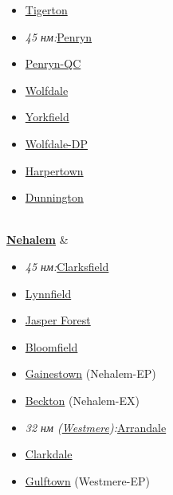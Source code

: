 \documentclass[a4paper,11pt]{article}
\begin{document}
\begin{tabular}
\begin{tabular}
\begin{tabular}
\begin{itemize}
	\item \href{https://ru.wikipedia.org/w/index.php?title=Tigerton&amp;action=edit&amp;redlink=1}{Tigerton}
	\item \textit{45 нм:}\href{https://ru.wikipedia.org/wiki/Penryn}{Penryn}
	\item \href{https://ru.wikipedia.org/w/index.php?title=Penryn-QC&amp;action=edit&amp;redlink=1}{Penryn-QC}
	\item \href{https://ru.wikipedia.org/w/index.php?title=Wolfdale&amp;action=edit&amp;redlink=1}{Wolfdale}
	\item \href{https://ru.wikipedia.org/wiki/Yorkfield}{Yorkfield}
	\item \href{https://ru.wikipedia.org/w/index.php?title=Wolfdale-DP&amp;action=edit&amp;redlink=1}{Wolfdale-DP}
	\item \href{https://ru.wikipedia.org/w/index.php?title=Harpertown&amp;action=edit&amp;redlink=1}{Harpertown}
	\item \href{https://ru.wikipedia.org/w/index.php?title=Dunnington&amp;action=edit&amp;redlink=1}{Dunnington}
\end{itemize} \\ 
\textbf{\href{https://ru.wikipedia.org/wiki/Nehalem}{Nehalem}} & 
\begin{itemize}
	\item \textit{45 нм:}\href{https://ru.wikipedia.org/w/index.php?title=Clarksfield&amp;action=edit&amp;redlink=1}{Clarksfield}
	\item \href{https://ru.wikipedia.org/w/index.php?title=Lynnfield&amp;action=edit&amp;redlink=1}{Lynnfield}
	\item \href{https://ru.wikipedia.org/w/index.php?title=Jasper_Forest&amp;action=edit&amp;redlink=1}{Jasper Forest}
	\item \href{https://ru.wikipedia.org/wiki/Bloomfield}{Bloomfield}
	\item \href{https://ru.wikipedia.org/w/index.php?title=Gainestown&amp;action=edit&amp;redlink=1}{Gainestown} (Nehalem-EP)
	\item \href{https://ru.wikipedia.org/w/index.php?title=Beckton&amp;action=edit&amp;redlink=1}{Beckton} (Nehalem-EX)
	\item \textit{32 нм (\href{https://ru.wikipedia.org/wiki/Westmere}{Westmere}):}\href{https://ru.wikipedia.org/w/index.php?title=Arrandale&amp;action=edit&amp;redlink=1}{Arrandale}
	\item \href{https://ru.wikipedia.org/wiki/Clarkdale}{Clarkdale}
	\item \href{https://ru.wikipedia.org/wiki/Gulftown}{Gulftown} (Westmere-EP)

\end{itemize}
\end{tabular}
\end{tabular}
\end{tabular}
\end{document}
